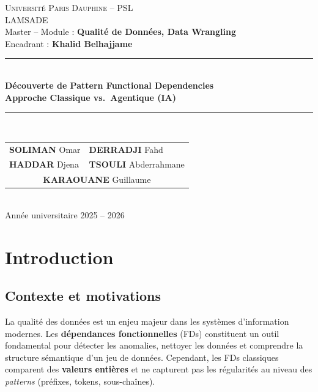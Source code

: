 \documentclass[12pt,a4paper]{article}
\begin{document}
\begin{titlepage}
\centering
\vspace*{1cm}

{\large \textsc{Universit\'{e} Paris Dauphine -- PSL}}\\[0.3cm]
{\large \textsc{LAMSADE}}\\[0.5cm]
{\normalsize Master -- Module : \textbf{Qualit\'{e} de Donn\'{e}es, Data Wrangling}}\\[0.3cm]
{\normalsize Encadrant : \textbf{Khalid Belhajjame}}\\[2cm]

\rule{\linewidth}{0.5mm}\\[0.6cm]
{\Huge \textbf{D\'{e}couverte de Pattern Functional Dependencies}}\\[0.3cm]
{\Large \textbf{Approche Classique vs.\ Agentique (IA)}}\\[0.3cm]
\rule{\linewidth}{0.5mm}\\[2cm]

{\large
\begin{tabular}{ll}
\textbf{SOLIMAN} Omar & \textbf{DERRADJI} Fahd \\[0.2cm]
\textbf{HADDAR} Djena & \textbf{TSOULI} Abderrahmane \\[0.2cm]
\multicolumn{2}{c}{\textbf{KARAOUANE} Guillaume}
\end{tabular}
}\\[3cm]

{\large Ann\'{e}e universitaire 2025 -- 2026}\\[1cm]

\vfill
\end{titlepage}

\tableofcontents
\newpage

\section{Introduction}

\subsection{Contexte et motivations}

La qualit\'{e} des donn\'{e}es est un enjeu majeur dans les syst\`{e}mes d'information modernes. Les \textbf{d\'{e}pendances fonctionnelles} (FDs) constituent un outil fondamental pour d\'{e}tecter les anomalies, nettoyer les donn\'{e}es et comprendre la structure s\'{e}mantique d'un jeu de donn\'{e}es. Cependant, les FDs classiques comparent des \textbf{valeurs enti\`{e}res} et ne capturent pas les r\'{e}gularit\'{e}s au niveau des \textit{patterns} (pr\'{e}fixes, tokens, sous-cha\^{i}nes).
\end{document}

